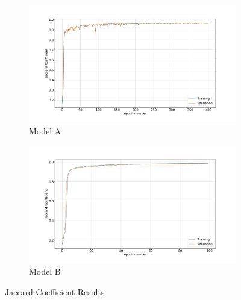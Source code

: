 \documentclass[12pt,a4paper]{scrartcl}
\begin{document}
\begin{figure}[H]
\centering
\begin{subfigure}{1\textwidth}
  \centering
  \includegraphics[width=\linewidth]{./results/model_a_jaccard.png}
  \caption{Model A}
  \label{fig:model_a_jaccard}
\end{subfigure}
\begin{subfigure}{1\textwidth}
  \centering
  \includegraphics[width=\linewidth]{./results/model_b_jaccard.png}
  \caption{Model B}
  \label{fig:modelb_jaccard}
\end{subfigure}
\caption{Jaccard Coefficient Results}
\label{fig:jaccard_results}
\end{figure}
\end{document}
